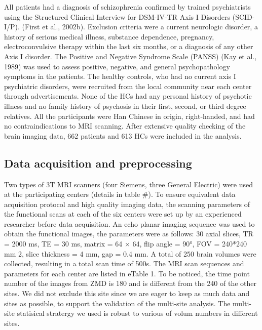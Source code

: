 \documentclass[preprint,authoryear,review,12pt]{elsarticle}
\begin{document}
All patients had a diagnosis of schizophrenia confirmed by trained psychiatrists using the Structured Clinical Interview for DSM-IV-TR Axis I Disorders (SCID-I/P). (First et al., 2002b). Exclusion criteria were a current neurologic disorder, a history of serious medical illness, substance dependence, pregnancy, electroconvulsive therapy within the last six months, or a diagnosis of any other Axis I disorder. The Positive and Negative Syndrome Scale (PANSS)  (Kay et al., 1989) was used to assess positive, negative, and general psychopathology symptoms in the patients. The healthy controls, who had no current axis I psychiatric disorders, were recruited from the local community near each center through advertisements. None of the HCs had any personal history of psychotic illness and no family history of psychosis in their first, second, or third degree relatives. All the participants were Han Chinese in origin, right-handed, and had no contraindications to MRI scanning. After extensive quality checking of the brain imaging data, 662 patients and 613 HCs were included in the analysis.
 
 
 
\subsection*{Data acquisition and preprocessing}
 
 
Two types of 3T MRI scanners (four Siemens, three General Electric) were used at the participating centers (details in table \#). To ensure equivalent data acquisition protocol and high quality imaging data, the scanning parameters of the functional scans at each of the six centers were set up by an experienced researcher before data acquisition. An echo planar imaging sequence was used to obtain the functional images, the parameters were as follows: 30 axial slices, TR = 2000 ms, TE = 30 ms, matrix = 64 × 64, flip angle = 90°, FOV = 240*240 mm 2, slice thickness = 4 mm, gap = 0.4 mm. A total of 250 brain volumes were collected, resulting in a total scan time of 500s. The MRI scan sequences and parameters for each center are listed in eTable 1. To be noticed, the time point number of the images from ZMD is 180 and is different from the 240 of the other sites. We did not exclude this site since we are eager to keep as much data and sites as possible, to support the validation of the multi-site analysis. The multi-site statisical stratergy we used is robust to various of volum numbers in different sites.    
\end{document}
